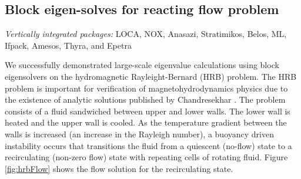 \documentclass[pdf,ps2pdf,11pt]{SANDreport}
\begin{document}
%
\subsection{Block eigen-solves for reacting flow problem}
%

{}\noindent\textit{Vertically integrated packages:} LOCA, NOX, Anasazi,
Stratimikos, Belos, ML, Ifpack, Amesos, Thyra, and Epetra

We successfully demonstrated large-scale eigenvalue calculations using
block eigensolvers on the hydromagnetic Rayleight-Bernard (HRB)
problem.  The HRB problem is important for verification of
magnetohydrodynamics physics due to the existence of analytic
solutions published by Chandresekhar \cite{book:HRB}.  The problem
consists of a fluid sandwiched between upper and lower walls.  The
lower wall is heated and the upper wall is cooled.  As the temperature
gradient between the walls is increased (an increase in the Rayleigh
number), a buoyancy driven instability occurs that transitions the
fluid from a quiescent (no-flow) state to a recirculating (non-zero
flow) state with repeating cells of rotating fluid.  Figure
\ref{fig:hrbFlow} shows the flow solution for the recirculating state.
\end{document}
